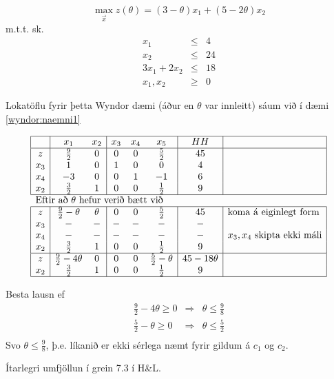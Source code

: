 \begin{daemi}
$$ \max_{\vec{x}} z(\theta)=(3-\theta)x_1+(5-2\theta)x_2$$
m.t.t. sk.
\begin{eqnarray*}
 x_1 &\leq& 4\\
x_2 &\leq& 24\\
3x_1+2x_2&\leq&18\\
x_1,x_2 &\geq&0
\end{eqnarray*}
\end{daemi}
\begin{lausn}Lokatöflu fyrir þetta Wyndor dæmi (áður en $\theta$ var innleitt) sáum við í dæmi \ref{wyndor:naemni1}
 \begin{center}
{\renewcommand{\arraystretch}{1.5} \renewcommand{\tabcolsep}{0.2cm}
{\scriptsize
\[\begin{array}{|c|cc|ccc|c|l|} \hline 
  &  x_1 &  x_2 & x_3 & x_4 & x_5 &  HH  &\\ \hline
 z &  \frac{9}{2} & 0 & 0 & 0 & \frac{5}{2}& 45 &\\ 
 x_3 &    1 & 0 & 1 & 0 & 0   & 4 &\\ 
 x_4 &   -3 & 0 & 0 & 1 &-1   & 6 &\\ 
 x_2 &  \frac{3}{2} & 1 & 0 & 0 & \frac{1}{2} & 9 &\\ \hline
\multicolumn{7}{l}{\mbox{Eftir að }\theta\mbox{ hefur verið bætt við}} \\ \hline 
 z &  \frac{9}{2}-\theta & \theta & 0 & 0 & \frac{5}{2}& 45 & \mbox{koma á eiginlegt form}\\ 
 x_3 &    - & - &- & - & -   & - & \mbox{}\\ 
 x_4 &   - & - & -  & - & -   & - & x_3,x_4\mbox{ skipta ekki máli}\\ 
 x_2 &  \frac{3}{2} & 1 & 0 & 0 & \frac{1}{2} & 9 &\\ \hline 
 z &  \frac{9}{2}-4\theta & 0 & 0 & 0 & \frac{5}{2}-\theta& 45-18\theta & \\ 
 x_2 &  \frac{3}{2} & 1 & 0 & 0 & \frac{1}{2} & 9 &\\ \hline 
\end{array}\]
}}\end{center} 
Besta lausn ef 
\begin{eqnarray*}
\frac{9}{2}-4\theta\geq0&\Rightarrow &\theta\leq \frac{9}{8}\\
\frac{5}{2}-\theta\geq0&\Rightarrow &\theta\leq \frac{5}{2}\\
\end{eqnarray*}
Svo $\theta\leq \frac{9}{8}$, þ.e. líkanið er ekki sérlega næmt fyrir gildum á $c_1$ og $c_2$. 
\begin{aths}Ítarlegri umfjöllun í grein 7.3 í H\&L.\end{aths}

\end{lausn}

